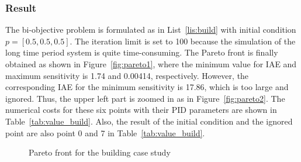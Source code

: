 \documentclass[11pt,oneside,onecolumn,openright]{article}
\begin{document}
\subsubsection{Result}
The bi-objective problem is formulated as in List~\ref{lis:build} with initial condition $p=[0.5,0.5,0.5]$. The iteration limit is set to 100 because the simulation of the long time period system is quite time-consuming. The Pareto front is finally obtained as shown in Figure~\ref{fig:pareto1}, where the minimum value for IAE and maximum sensitivity is 1.74 and 0.00414, respectively. However, the corresponding IAE for the minimum sensitivity is 17.86, which is too large and ignored. Thus, the upper left part is zoomed in as in Figure~\ref{fig:pareto2}. The numerical costs for these six points with their PID parameters are shown in Table~\ref{tab:value_build}. Also, the result of the initial condition and the ignored point are also point 0 and 7 in Table~\ref{tab:value_build}.

 \begin{figure}[t]
  \centering
  \caption{Pareto front for the building case study}
  \label{fig:pareto_build}
  \end{figure}
\end{document}
